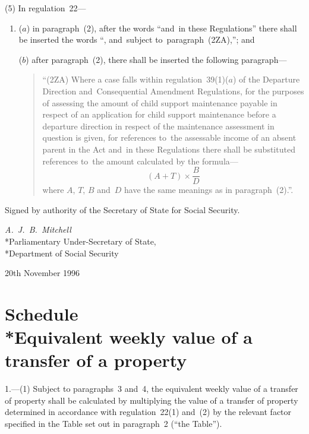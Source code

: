 \documentclass[12pt,a4paper]{article}
\begin{document}
(5) In regulation~22—
\begin{enumerate}\item[]
($a$) in paragraph~(2), after the words “and~in these Regulations” there shall be
inserted the words “, and~subject to~paragraph~(2ZA),”; and

($b$) after paragraph~(2), there shall be inserted the following paragraph—
\begin{quotation}
“(2ZA) Where a case falls within regulation~39(1)($a$) of the Departure Direction
and~Consequential Amendment Regulations, for the purposes of assessing the
amount of child support maintenance payable in respect of an application for
child support maintenance before a departure direction in respect of the
maintenance assessment in question is given, for references to~the assessable
income of an absent parent in the Act and~in these Regulations there shall be
substituted references to~the amount calculated by the formula—
\[(A + T) \times \frac{B}{D}\]
where $A$, $T$, $B$ and~$D$ have the same meanings as in paragraph~(2).”.
\end{quotation}
\end{enumerate}


\bigskip

Signed by authority of the Secretary of State for Social Security.

{\raggedleft
\emph{A.~J.~B.~Mitchell}\\*Parliamentary Under-Secretary of
State,\\*Department of Social Security

}

20th November 1996

\small

\part[Schedule~--- Equivalent weekly value of a transfer of a property]{Schedule\\*Equivalent weekly value of a transfer of a property}

\renewcommand\parthead{--- Schedule}

1.—(1) Subject to
paragraphs~3 and~4, the equivalent weekly value of a transfer of property shall
be calculated by multiplying the value of a transfer of property determined in
accordance with regulation~22(1) and~(2) by the relevant factor specified in the
Table set out in paragraph~2 (“the Table”).
\end{document}
